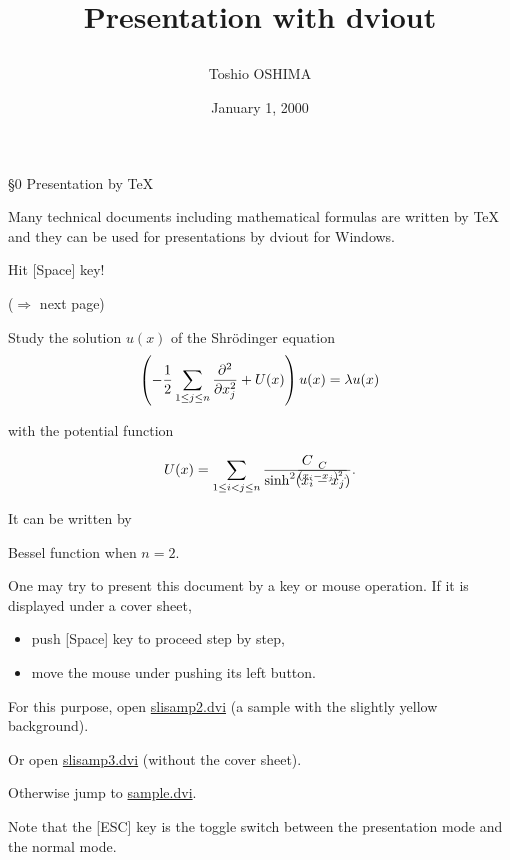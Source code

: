 \documentclass{slides}
\title{Presentation with dviout%
\special{dviout `keep y}
\special{dviout -e=0 -y=XGAP !AN0!w!p;!b!0df}
\pagecolor[rgb]{1,1,0.8}%
}
\author{Toshio OSHIMA}
\date{January 1, 2000}
\begin{document}
\maketitle

\begin{slide}
\pagecolor[rgb]{1,1,0.8}%
{\large \S0 Presentation by \TeX}

Many technical documents including mathematical formulas are written by
{\TeX} and they can be used for presentations by dviout for Windows.

{\color{red} Hit [Space] key!}
%
{\color{red}($\Rightarrow$ next page)}

Study the solution $u(x)$ of the Shr\"odinger equation
\[
\left(-\frac12\sum_{1\le j\le n}\frac{\partial^2}{\partial x_j^2} + 
\special{dviout `+2,4}\special{color push Red}\special{dviout `+1-}
U(x)
\special{dviout `+2,4}\special{color pop}\special{dviout `+1-}
\right)u(x) = \lambda u(x)
\]

with the potential function

\[
 U(x) = \sum_{1\le i < j\le n}
\special{dviout `+2-3}\makebox[0pt]{$\hspace*{3cm}\frac{C}{(x_i - x_j)^2.}$}
\special{dviout `+4-}\frac{C}{\sinh^2(x_i - x_j)}.
\]

It can be written by 
%
{Bessel function when $n=2$.}
\end{slide}
\begin{slide}
\pagecolor[rgb]{1,1,0.8}%
One may try to present this document by a key or mouse operation.
If it is displayed under a cover sheet,
\begin{itemize}
\item
push [Space] key to proceed step by step,
\item
move the mouse under pushing its left button.
\end{itemize}
For this purpose, open \href{file:slisamp2.dvi}{slisamp2.dvi} (a sample 
with the slightly yellow background).

Or open \href{file:slisamp3.dvi}{slisamp3.dvi} (without the cover sheet).

Otherwise jump to \href{file:sample.dvi}{sample.dvi}. %

Note that the [ESC] key is the toggle switch between the presentation mode and
the normal mode.
\end{slide}
\end{document}
